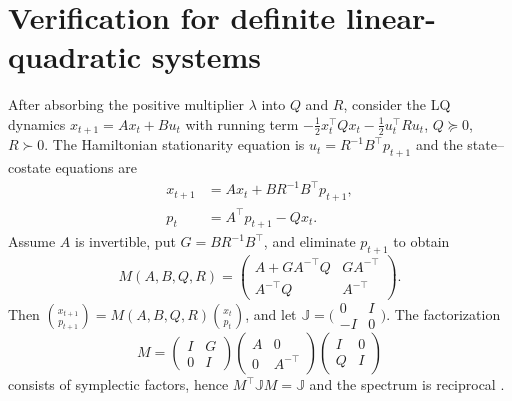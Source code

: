 \documentclass[twocolumn,nameyear,amsthm]{autart}
\newcommand{\Jc}{\mathbb J}
\numberwithin{equation}{section}
\begin{document}
\section{Verification for definite linear-quadratic systems}\label{sec:lq}
After absorbing the positive multiplier $\lambda$ into $Q$ and $R$, consider
the LQ dynamics $x_{t+1}=Ax_t+Bu_t$ with running term
$-\frac12x_t^\top Qx_t-\frac12u_t^\top Ru_t$, $Q\succeq0$, $R\succ0$.
The Hamiltonian stationarity equation is $u_t=R^{-1}B^\top p_{t+1}$ and the
state--costate equations are
\begin{equation}\label{eq:lq-system-ric}
\begin{aligned}
      x_{t+1}&=Ax_t+BR^{-1}B^\top p_{t+1},\\
      p_t&=A^\top p_{t+1}-Qx_t.
\end{aligned}
\end{equation}
Assume $A$ is invertible, put $G=BR^{-1}B^\top$, and eliminate
$p_{t+1}$ to obtain
{\setlength{\arraycolsep}{3pt}
\begin{equation}\label{eq:lq-M}
      M(A,B,Q,R)=
      \begin{pmatrix}
        A+GA^{-\top}Q & GA^{-\top}\\
        A^{-\top}Q & A^{-\top}
      \end{pmatrix}.
\end{equation}
}
Then $\binom{x_{t+1}}{p_{t+1}}=M(A,B,Q,R)\binom{x_t}{p_t}$, and let $\Jc=\bigl(\begin{smallmatrix}0&I\\-I&0\end{smallmatrix}\bigr)$.
The factorization
\[
 M=
 \begin{pmatrix}I&G\\0&I\end{pmatrix}
 \begin{pmatrix}A&0\\0&A^{-\top}\end{pmatrix}
 \begin{pmatrix}I&0\\Q&I\end{pmatrix}
\]
consists of symplectic factors, hence $M^\top\Jc M=\Jc$ and the spectrum is
reciprocal \citep{bittanti1991riccati}.
\end{document}
